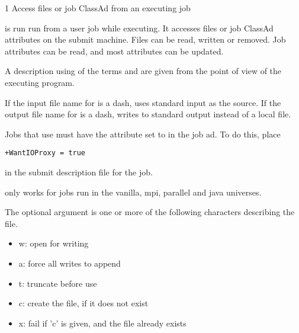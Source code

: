 \begin{ManPage}{\label{man-condor-chirp}}{1}
{Access files or job ClassAd from an executing job}
\Synopsis
{}

  

    

 

 

  

\Description 
{}
 is run run from a user job while executing.
It accesses files or job ClassAd attributes on the submit machine.
Files can be read, written or removed.
Job attributes can be read, and most attributes can be updated.

A description using of the terms  and 
are given from the point of view of the executing program.

If the input file name for  is a dash,
 uses standard input as the source.
If the output file name for  is a dash,
 writes to standard output instead of a local file.

Jobs that use  must have the attribute
 set to  in the job ad.
To do this, place
\begin{verbatim}
+WantIOProxy = true
\end{verbatim}
in the submit description file for the job.

 only works for jobs run in the
vanilla, mpi, parallel and java universes.

The optional  argument
is one or more of the following characters describing the
 file.
  \begin{itemize}
    \item{w:  open for writing}
    \item{a:  force all writes to append}
    \item{t:  truncate before use}
    \item{c:  create the file, if it does not exist}
    \item{x:  fail if 'c' is given, and the file already exists}
  \end{itemize}


\end{ManPage}
